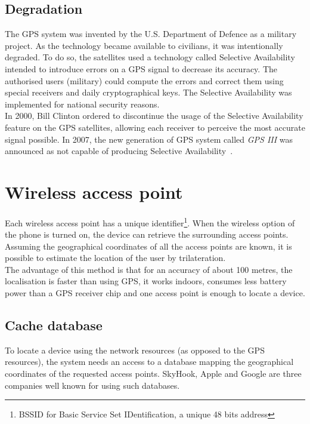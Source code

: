 \subsection{Degradation}

The GPS system was invented by the U.S. Department of Defence as a military project.
As the technology became available to civilians, it was intentionally degraded.
To do so, the satellites used a technology called Selective Availability intended to introduce errors on a GPS signal to decrease its accuracy.
The authorised users (military) could compute the errors and correct them using special receivers and daily cryptographical keys.
The Selective Availability was implemented for national security reasons.\\

In 2000, Bill Clinton ordered to discontinue the usage of the Selective Availability feature on the GPS satellites, allowing each receiver to perceive the most accurate signal possible. In 2007, the new generation of GPS system called \emph{GPS III} was announced as not capable of producing Selective Availability~\cite{gps-sa}.\\

\section{Wireless access point}
\label{sec:andro-wifi}
Each wireless access point has a unique identifier\footnote{BSSID for Basic Service Set IDentification, a unique 48 bits address}.
When the wireless option of the phone is turned on, the device can retrieve the surrounding access points.
Assuming the geographical coordinates of all the access points are known, it is possible to estimate the location of the user by trilateration.\\

The advantage of this method is that for an accuracy of about 100 metres, the localisation is faster than using GPS, it works indoors, consumes less battery power than a GPS receiver chip and one access point is enough to locate a device.\\

\subsection{Cache database}
\label{sec:andro-cell-db}

To locate a device using the network resources (as opposed to the GPS resources), the system needs an access to a database mapping the geographical coordinates of the requested access points.
SkyHook, Apple and Google are three companies well known for using such databases.\\

